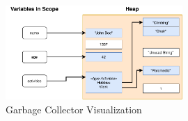\begin{figure}[htp!]
    \centering
    \includegraphics[width=0.6\textwidth]{assets/figures/chapter3/gc-visualization.pdf}
    \caption{Garbage Collector Visualization}
    \label{fig:gc-visualization}
\end{figure}
